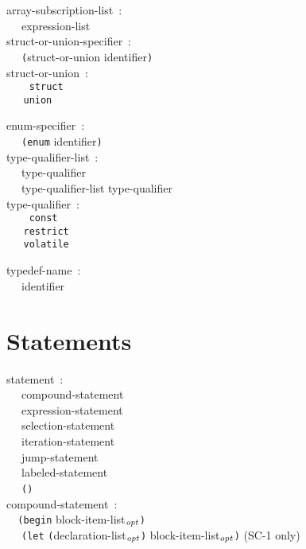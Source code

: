 \documentclass[a4]{article}
\def\|{\verb|} %|
\newcommand{\opt}{$_{{\it opt}}$}
\newcommand{\scoo}{{\rm \hfill (SC-1 only)}}
\begin{document}
\noindent
array-subscription-list{\rm \ :} \\
\|  | expression-list \\

\noindent
struct-or-union-specifier{\rm \ :} \\
\|  | {\tt (}struct-or-union identifier{\tt )} \\

\noindent
struct-or-union{\rm \ :} \\ \tt
\|  | struct \\
\|  | union \\ \it

\noindent
enum-specifier{\rm \ :} \\
\|  | {\tt (enum} identifier{\tt )} \\

\noindent
type-qualifier-list{\rm \ :} \\
\|  | type-qualifier \\
\|  | type-qualifier-list type-qualifier \\

\noindent
type-qualifier{\rm \ :} \\ \tt
\|  | const \\
\|  | restrict \\
\|  | volatile \\ \it

\noindent
typedef-name{\rm \ :} \\
\|  | identifier \\
\rm
\section{Statements}

\it

\noindent
statement{\rm \ :} \\
\|  | compound-statement \\
\|  | expression-statement \\
\|  | selection-statement \\
\|  | iteration-statement \\
\|  | jump-statement \\
\|  | labeled-statement \\
\|  | {\tt ()} \\

\noindent
compound-statement{\rm \ :} \\
\|  | {\tt (}{\tt begin} block-item-list\opt{\tt )} \\
\|  | {\tt (}{\tt let} {\tt (}declaration-list\opt {\tt )} block-item-list\opt{\tt )} \scoo \\
\end{document}
